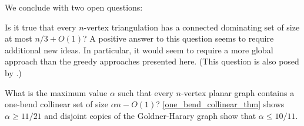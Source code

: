 \documentclass{article}
\theoremstyle{definition}
\begin{document}
We conclude with two open questions:

\begin{compactenum}
  \item Is it true that every $n$-vertex triangulation has a connected dominating set of size at most $n/3+O(1)$?  A positive answer to this question seems to require additional new ideas.  In particular, it would seem to require a more global approach than the greedy approaches presented here. (This question is also posed by \citet[Question~4.2]{bradshaw.masarik.ea:robust}.)

  \item What is the maximum value $\alpha$ such that every $n$-vertex planar graph contains a one-bend collinear set of size $\alpha n-O(1)$?  \cref{one_bend_collinear_thm} shows $\alpha \ge 11/21$ and disjoint copies of the Goldner-Harary graph show that $\alpha \le 10/11$.

\end{compactenum}








% 
\end{document}
